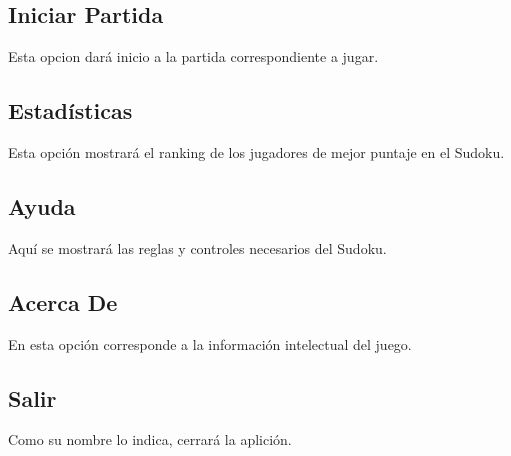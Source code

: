 \documentclass[12pt]{article}
\begin{document}
	\subsection{Iniciar Partida}
		Esta opcion dará inicio a la partida correspondiente a jugar.

	\subsection{Estadísticas}
		Esta opción mostrará el ranking de los jugadores de mejor puntaje en el Sudoku.

	\subsection{Ayuda}
		Aquí se mostrará las reglas y controles necesarios del Sudoku.

	\subsection{Acerca De}
		En esta opción corresponde a la información intelectual del juego.

	\subsection{Salir}
		Como su nombre lo indica, cerrará la aplición.
\end{document}
